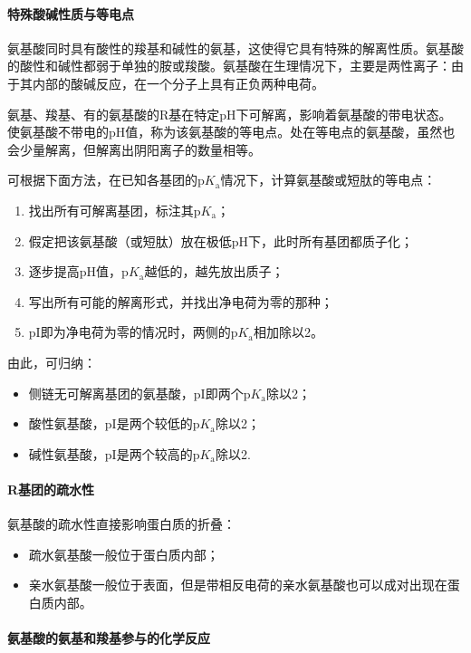\paragraph{特殊酸碱性质与等电点}

氨基酸同时具有酸性的羧基和碱性的氨基，这使得它具有特殊的解离性质。氨基酸的酸性和碱性都弱于单独的胺或羧酸。氨基酸在生理情况下，主要是两性离子：由于其内部的酸碱反应，在一个分子上具有正负两种电荷。

氨基、羧基、有的氨基酸的R基在特定pH下可解离，影响着氨基酸的带电状态。使氨基酸不带电的pH值，称为该氨基酸的等电点。处在等电点的氨基酸，虽然也会少量解离，但解离出阴阳离子的数量相等。

可根据下面方法，在已知各基团的$\mathrm{p}K_{\text{a}}$情况下，计算氨基酸或短肽的等电点：
\begin{enumerate}
	\item 找出所有可解离基团，标注其$\mathrm{p}K_{\text{a}}$；
	\item 假定把该氨基酸（或短肽）放在极低pH下，此时所有基团都质子化；
	\item 逐步提高pH值，$\mathrm{p}K_{\text{a}}$越低的，越先放出质子；
	\item 写出所有可能的解离形式，并找出净电荷为零的那种；
	\item pI即为净电荷为零的情况时，两侧的$\mathrm{p}K_{\text{a}}$相加除以2。
\end{enumerate}

由此，可归纳：
\begin{itemize}
	\item 侧链无可解离基团的氨基酸，pI即两个$\mathrm{p}K_{\text{a}}$除以2；
	\item 酸性氨基酸，pI是两个较低的$\mathrm{p}K_{\text{a}}$除以2；
	\item 碱性氨基酸，pI是两个较高的$\mathrm{p}K_{\text{a}}$除以2.
\end{itemize}

\paragraph{R基团的疏水性}

氨基酸的疏水性直接影响蛋白质的折叠：
\begin{itemize}
	\item 疏水氨基酸一般位于蛋白质内部；
	\item 亲水氨基酸一般位于表面，但是带相反电荷的亲水氨基酸也可以成对出现在蛋白质内部。
\end{itemize}

\paragraph{氨基酸的氨基和羧基参与的化学反应}


